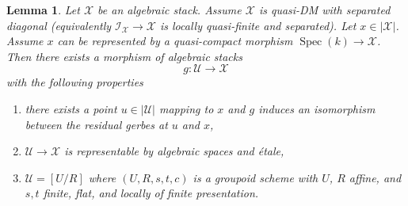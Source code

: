 \documentclass{stacks-project}
\theoremstyle{plain}
\newtheorem{lemma}[subsection]{Lemma}
\theoremstyle{definition}
\theoremstyle{remark}
\numberwithin{equation}{subsection}
\def\Spec{\mathop{\mathrm{Spec}}}
\begin{document}
\begin{lemma}
\label{lemma-etale-local-quasi-DM-at-x-inertia}
Let $\mathcal{X}$ be an algebraic stack. Assume $\mathcal{X}$ is
quasi-DM with separated diagonal (equivalently
$\mathcal{I}_\mathcal{X} \to \mathcal{X}$ is locally quasi-finite and
separated). Let $x \in |\mathcal{X}|$. Assume $x$ can be represented
by a quasi-compact morphism $\Spec(k) \to \mathcal{X}$.
Then there exists a morphism of algebraic stacks
$$
g : \mathcal{U} \longrightarrow \mathcal{X}
$$
with the following properties
\begin{enumerate}
\item there exists a point $u \in |\mathcal{U}|$ mapping to $x$ and
$g$ induces an isomorphism between the residual gerbes at $u$ and $x$,
\item $\mathcal{U} \to \mathcal{X}$ is representable by algebraic spaces and
\'etale,
\item $\mathcal{U} = [U/R]$ where $(U, R, s, t, c)$ is a groupoid
scheme with $U$, $R$ affine, and $s, t$ finite, flat, and
locally of finite presentation.
\end{enumerate}
\end{lemma}
\end{document}
